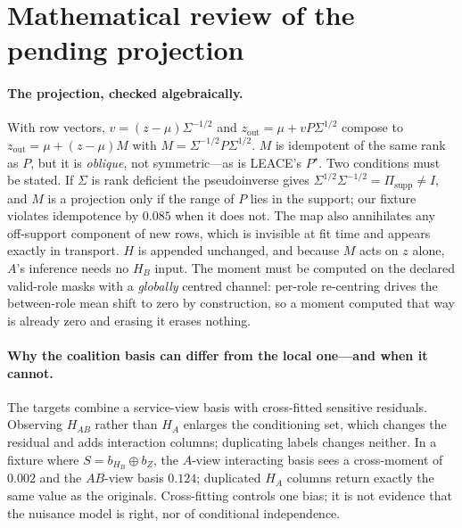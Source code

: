 \documentclass[10pt]{article}
\begin{document}
\section{Mathematical review of the pending projection}
\label{app:mathv4}
\paragraph{The projection, checked algebraically.} With row vectors, $v=(z-\mu)\Sigma^{-1/2}$ and
$z_{\mathrm{out}}=\mu+vP\Sigma^{1/2}$ compose to $z_{\mathrm{out}}=\mu+(z-\mu)M$ with
$M=\Sigma^{-1/2}P\Sigma^{1/2}$. $M$ is idempotent of the same rank as $P$, but it is \emph{oblique}, not
symmetric---as is LEACE's $P^\star$. Two conditions must be stated. If $\Sigma$ is rank deficient the
pseudoinverse gives $\Sigma^{1/2}\Sigma^{-1/2}=\Pi_{\mathrm{supp}}\neq I$, and $M$ is a projection only
if the range of $P$ lies in the support; our fixture violates idempotence by $0.085$ when it does not. The
map also annihilates any off-support component of new rows, which is invisible at fit time and appears
exactly in transport. $H$ is appended unchanged, and because $M$ acts on $z$ alone, $A$'s inference
needs no $H_B$ input. The moment must be computed on the declared valid-role masks with a
\emph{globally} centred channel: per-role re-centring drives the between-role mean shift to zero by
construction, so a moment computed that way is already zero and erasing it erases nothing.

\paragraph{Why the coalition basis can differ from the local one---and when it cannot.} The targets combine
a service-view basis with cross-fitted sensitive residuals. Observing $H_{AB}$ rather than $H_A$ enlarges
the conditioning set, which changes the residual and adds interaction columns; duplicating labels changes
neither. In a fixture where $S=b_{H_B}\oplus b_Z$, the $A$-view interacting basis sees a cross-moment of
$0.002$ and the $AB$-view basis $0.124$; duplicated $H_A$ columns return exactly the same value as the
originals. Cross-fitting controls one bias; it is not evidence that the nuisance model is right, nor of
conditional independence.
\end{document}
